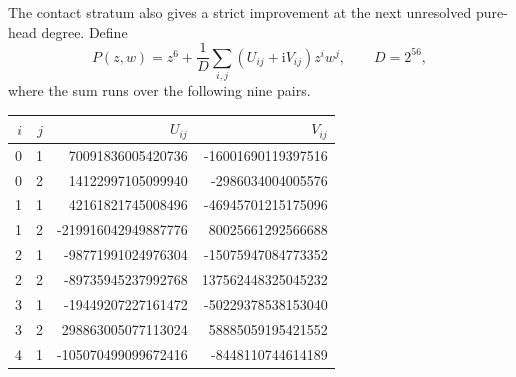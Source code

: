 \documentclass[UTF8,11pt]{ctexart}
\theoremstyle{definition}
\numberwithin{equation}{section}
\begin{document}
The contact stratum also gives a strict improvement at the next
unresolved pure-head degree. Define
\begin{equation}\label{v22:eq:polynomial}
 P(z,w)=z^6+\frac1D\sum_{i,j}(U_{ij}+\mathrm{i}V_{ij})z^i w^j,
 \qquad D=2^{56},
\end{equation}
where the sum runs over the following nine pairs.
\begin{center}\small
\begin{tabular}{@{}rrrr@{}}
\toprule
$i$&$j$&$U_{ij}$&$V_{ij}$\\
\midrule
0&1&70091836005420736&-16001690119397516 \\
0&2&14122997105099940&-2986034004005576 \\
1&1&42161821745008496&-46945701215175096 \\
1&2&-219916042949887776&80025661292566688 \\
2&1&-98771991024976304&-15075947084773352 \\
2&2&-89735945237992768&137562448325045232 \\
3&1&-19449207227161472&-50229378538153040 \\
3&2&298863005077113024&58885059195421552 \\
4&1&-105070499099672416&-8448110744614189 \\
\bottomrule
\end{tabular}
\end{center}
\end{document}
